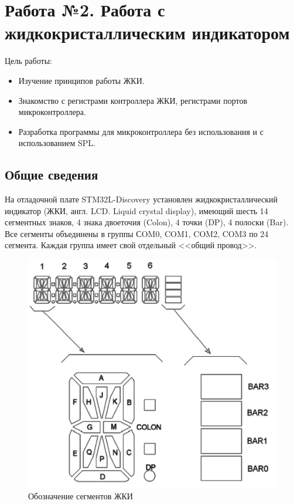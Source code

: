 \chapter{Работа №2. Работа с жидкокристаллическим индикатором}
Цель работы: 
\begin{itemize}
\item Изучение принципов работы ЖКИ.
\item Знакомство с регистрами контроллера ЖКИ, регистрами портов микроконтроллера.
\item Разработка программы для микроконтроллера без использования и с использованием SPL.
\end{itemize}

\section{Общие сведения}

На отладочной плате STM32L-Discovery установлен жидкокристаллический индикатор (ЖКИ, англ. LCD. Liquid crystal display), имеющий шесть 14 сегментных знаков, 4 знака двоеточия (Colon), 4 точки (DP), 4 полоски (Bar). Все сегменты объединены в группы СOM0, COM1, COM2, COM3 по 24 сегмента. Каждая группа имеет свой отдельный <<общий провод>>.

\begin{figure}[h!]
\begin{center}
\includegraphics[scale=0.4]{Image/23.jpg}
\end{center}

\caption{Обозначение сегментов ЖКИ}
\end{figure}

